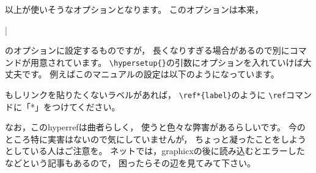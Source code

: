 \documentclass[class=jreport, crop=false, preview=false, dvipdfmx, fleqn]{standalone}
\begin{document}
以上が使いそうなオプションとなります。
このオプションは本来，
\begin{ITeX}
\usepackage{hyperref}|
\end{ITeX}
のオプションに設定するものですが，
長くなりすぎる場合があるので別にコマンドが用意されています。
\verb|\hypersetup{}|の引数にオプションを入れていけば大丈夫です。
例えばこのマニュアルの設定は以下のようになっています。

\begin{ITeX}
\end{ITeX}

もしリンクを貼りたくないラベルがあれば，
\verb|\ref*{label}|のように
\verb|\ref|コマンドに「*」をつけてください。

なお，このhyperrefは曲者らしく，
使うと色々な弊害があるらしいです。
今のところ特に実害はないので気にしていませんが，
ちょっと凝ったことをしようとしている人はご注意を。
ネットでは，graphicxの後に読み込むとエラーしたなどという記事もあるので，
困ったらその辺を見てみて下さい。
\end{document}
